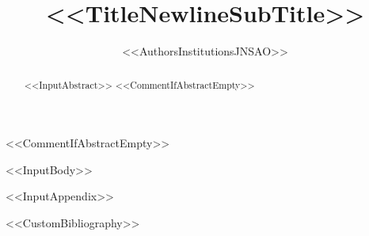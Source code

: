 \documentclass[%
english,
<<DocumentClassOptions>>]{jnsao}
\title{<<TitleNewlineSubTitle>>}
\author{%
<<AuthorsInstitutionsJNSAO>>
}
\begin{document}
\maketitle

<<CommentIfAbstractEmpty>>\begin{abstract}
<<InputAbstract>>
<<CommentIfAbstractEmpty>>\end{abstract}

<<InputBody>>

\appendix
<<InputAppendix>>


<<CustomBibliography>>
\end{document}
